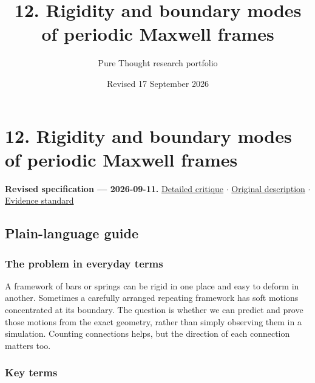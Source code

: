 \documentclass[
  11pt,
]{article}
\title{12. Rigidity and boundary modes of periodic Maxwell frames}
\author{Pure Thought research portfolio}
\date{Revised 17 September 2026}
\begin{document}
\maketitle
\thispagestyle{empty}
\clearpage

\section{12. Rigidity and boundary modes of periodic Maxwell frames}

\textbf{Revised specification --- 2026-09-11.}
\href{https://github.com/rick-stevens-ai/Pure-Thought/blob/main/reviews/12-Topological-Mechanical-Metamaterials.md}{Detailed
critique} \ensuremath{\cdot}
\href{https://github.com/rick-stevens-ai/Pure-Thought/blob/main/archive/original-PRDs/12-Topological-Mechanical-Metamaterials.md}{Original
description} \ensuremath{\cdot}
\href{https://github.com/rick-stevens-ai/Pure-Thought/blob/main/reviews/EVIDENCE-STANDARD.md}{Evidence
standard}

\subsection{Plain-language guide}

\subsubsection{The problem in everyday terms}

A framework of bars or springs can be rigid in one place and easy to
deform in another. Sometimes a carefully arranged repeating framework
has soft motions concentrated at its boundary. The question is whether
we can predict and prove those motions from the exact geometry, rather
than simply observing them in a simulation. Counting connections helps,
but the direction of each connection matters too.

\subsubsection{Key terms}
\end{document}
